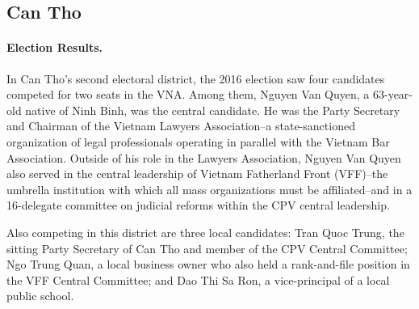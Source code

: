 \documentclass[12pt]{article}
\newcommand{\1}{\mathbbm{1}}
\begin{document}
\subsection{Can Tho}

\paragraph{Election Results.} 

In Can Tho's second electoral district, the 2016 election saw four candidates competed for two seats in the VNA. Among them, Nguyen Van Quyen, a 63-year-old native of Ninh Binh, was the central candidate. He was the Party Secretary and Chairman of the Vietnam Lawyers Association--a state-sanctioned organization of legal professionals operating in parallel with the Vietnam Bar Association. Outside of his role in the Lawyers Association, Nguyen Van Quyen also served in the central leadership of Vietnam Fatherland Front (VFF)--the umbrella institution with which all mass organizations must be affiliated--and in a 16-delegate committee on judicial reforms within the CPV central leadership.

Also competing in this district are three local candidates: Tran Quoc Trung, the sitting Party Secretary of Can Tho and member of the CPV Central Committee; Ngo Trung Quan, a local business owner who also held a rank-and-file position in the VFF Central Committee; and Dao Thi Sa Ron, a vice-principal of a local public school. 
\end{document}

